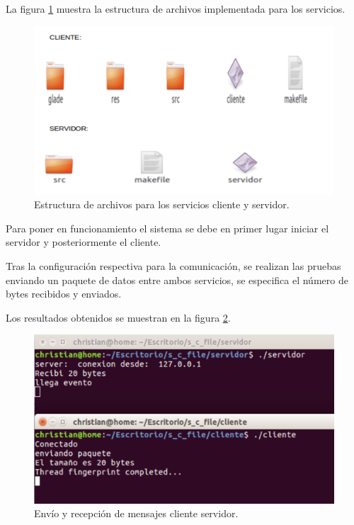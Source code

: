 La figura \ref{fig:archivos} muestra la estructura de archivos implementada para los servicios.
\begin{figure}[h]
	\centering
	\includegraphics[scale=.2]{./Figures/archivos.png}
	\caption{Estructura de archivos para los servicios cliente y servidor.}
	\label{fig:archivos}
\end{figure}


Para poner en funcionamiento el sistema se debe en primer lugar iniciar el servidor y posteriormente el cliente.

Tras la configuración respectiva para la comunicación, se realizan las pruebas enviando un paquete de datos entre ambos servicios, se especifica el número de bytes recibidos y enviados. 

Los resultados obtenidos se muestran en la figura \ref{fig:mensaje}.

\begin{figure}[h]
	\centering
	\includegraphics[scale=.2]{./Figures/mensaje.png}
	\caption{Envío y recepción de mensajes cliente servidor.}
	\label{fig:mensaje}
\end{figure}

